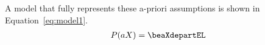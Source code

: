 A model that fully represents these a-priori assumptions is shown in Equation~\ref{eq:model1}.
\begin{align}
    P(aX) = \beaXdepartEL
\end{align}
